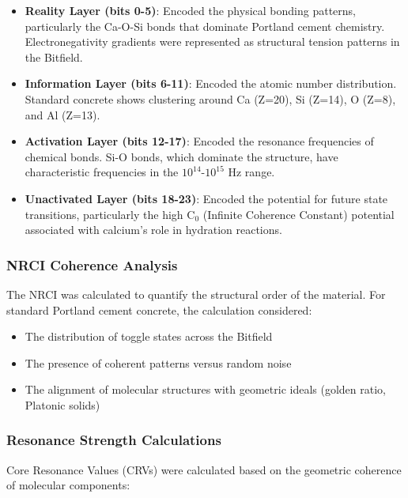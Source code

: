 \documentclass[11pt,a4paper]{article}
\begin{document}
\begin{itemize}
    \item \textbf{Reality Layer (bits 0-5)}: Encoded the physical bonding patterns, particularly the Ca-O-Si bonds that dominate Portland cement chemistry. Electronegativity gradients were represented as structural tension patterns in the Bitfield.
    
    \item \textbf{Information Layer (bits 6-11)}: Encoded the atomic number distribution. Standard concrete shows clustering around Ca (Z=20), Si (Z=14), O (Z=8), and Al (Z=13).
    
    \item \textbf{Activation Layer (bits 12-17)}: Encoded the resonance frequencies of chemical bonds. Si-O bonds, which dominate the structure, have characteristic frequencies in the $10^{14}$-$10^{15}$ Hz range.
    
    \item \textbf{Unactivated Layer (bits 18-23)}: Encoded the potential for future state transitions, particularly the high C$_0$ (Infinite Coherence Constant) potential associated with calcium's role in hydration reactions.
\end{itemize}

\subsubsection{NRCI Coherence Analysis}

The NRCI was calculated to quantify the structural order of the material. For standard Portland cement concrete, the calculation considered:

\begin{itemize}
    \item The distribution of toggle states across the Bitfield
    \item The presence of coherent patterns versus random noise
    \item The alignment of molecular structures with geometric ideals (golden ratio, Platonic solids)
\end{itemize}

\subsubsection{Resonance Strength Calculations}

Core Resonance Values (CRVs) were calculated based on the geometric coherence of molecular components:
\end{document}

